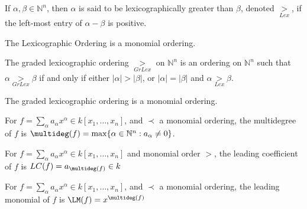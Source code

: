                 \begin{definition}
                    If $\alpha,\beta \in \mathbb{N}^n$, then $\alpha$
                    is said to be lexicographically greater than
                    $\beta$, denoted $\underset{Lex}{>}$,
                    if the left-most entry of
                    $\alpha-\beta$ is positive.
                \end{definition}
                \begin{theorem}
                    The Lexicographic Ordering
                    is a monomial ordering.
                \end{theorem}
                \begin{definition}
                    The graded lexicographic ordering
                    $\underset{GrLex}{>}$ on $\mathbb{N}^n$ is an
                    ordering on $\mathbb{N}^n$ such that
                    $\alpha\underset{GrLex}{>}\beta$ if and only if
                    either $|\alpha|>|\beta|$, or
                    $|\alpha|=|\beta|$ and
                    $\alpha\underset{Lex}{>}\beta$.
                \end{definition}
                \begin{theorem}
                    The graded lexicographic
                    ordering is a monomial ordering.
                \end{theorem}
                \begin{definition}
                    For
                    $f=\sum_{\alpha}%
                       a_{\alpha}x^{\alpha}\in{k}[x_{1},\hdots,x_{n}]$,
                    and $\prec$ a monomial ordering,
                    the multidegree of $f$ is
                    $\multideg(f)%
                     =\max\{\alpha\in\mathbb{N}^n:a_{\alpha}\ne{0}\}$.
                \end{definition}
                \begin{definition}
                    For
                    $f=\sum_{\alpha}%
                       a_\alpha{x}^\alpha\in k[x_{1},\hdots,x_{n}]$
                    and monomial order $>$, the leading
                    coefficient of $f$ is
                    $LC(f)=a_{\multideg(f)}\in{k}$
                \end{definition}
                \begin{definition}
                    For
                    $f=\sum_{\alpha}%
                       a_{\alpha}x^{\alpha}\in{k}[x_{1},\hdots,x_{n}]$,
                    and $\prec$ a monomial ordering, the leading
                    monomial of $f$ is $\LM(f)=x^{\multideg(f)}$
                \end{definition}
